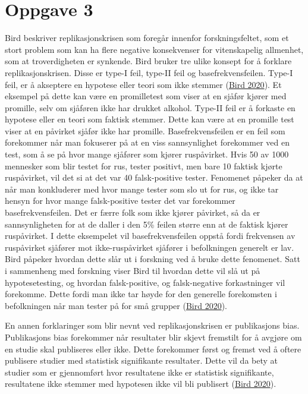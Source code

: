 \documentclass[
]{book}
\begin{document}
\hypertarget{oppgave-3}{%
\section{Oppgave 3}\label{oppgave-3}}

Bird beskriver replikasjonskrisen som foregår innenfor forskningsfeltet,
som et stort problem som kan ha flere negative konsekvenser for
vitenskapelig allmenhet, som at troverdigheten er synkende. Bird bruker
tre ulike konsept for å forklare replikasjonskrisen. Disse er type-I
feil, type-II feil og basefrekvensfeilen. Type-I feil, er å akseptere en
hypotese eller teori som ikke stemmer
(\protect\hyperlink{ref-bird2020}{Bird 2020}). Et eksempel på dette kan
være en promilletest som viser at en sjåfør kjører med promille, selv om
sjåføren ikke har drukket alkohol. Type-II feil er å forkaste en
hypotese eller en teori som faktisk stemmer. Dette kan være at en
promille test viser at en påvirket sjåfør ikke har promille.
Basefrekvensfeilen er en feil som forekommer når man fokuserer på at en
viss sannsynlighet forekommer ved en test, som å se på hvor mange
sjåfører som kjører ruspåvirket. Hvis 50 av 1000 mennesker som blir
testet for rus, tester positivt, men bare 10 faktisk kjørte ruspåvirket,
vil det si at det var 40 falsk-positive tester. Fenomenet påpeker da at
når man konkluderer med hvor mange tester som slo ut for rus, og ikke
tar hensyn for hvor mange falsk-positive tester det var forekommer
basefrekvensfeilen. Det er færre folk som ikke kjører påvirket, så da er
sannsynligheten for at de daller i den 5\% feilen større enn at de
faktisk kjører ruspåvirket. I dette eksempelet vil basefrekvensfeilen
oppstå fordi frekvensen av ruspåvirket sjåfører mot ikke-ruspåvirket
sjåfører i befolkningen generelt er lav. Bird påpeker hvordan dette slår
ut i forskning ved å bruke dette fenomenet. Satt i sammenheng med
forskning viser Bird til hvordan dette vil slå ut på hypotesetesting, og
hvordan falsk-positive, og falsk-negative forkastninger vil forekomme.
Dette fordi man ikke tar høyde for den generelle forekomsten i
befolkningen når man tester på for små grupper
(\protect\hyperlink{ref-bird2020}{Bird 2020}).

En annen forklaringer som blir nevnt ved replikasjonskrisen er
publikasjons bias. Publikasjons bias forekommer når resultater blir
skjevt fremstilt for å avgjøre om en studie skal publiseres eller ikke.
Dette forekommer først og fremst ved å oftere publisere studier med
statistisk signifikante resultater. Dette vil da bety at studier som er
gjennomført hvor resultatene ikke er statistisk signifikante,
resultatene ikke stemmer med hypotesen ikke vil bli publisert
(\protect\hyperlink{ref-bird2020}{Bird 2020}).
\end{document}
